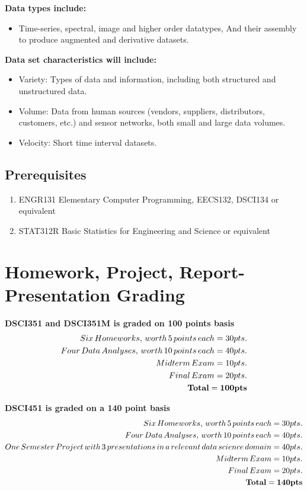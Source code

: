 \documentclass[11pt]{article} %
\begin{document}
    {\bf Data types include:}
    \begin{itemize}
    	\item Time-series, spectral, image and higher order datatypes, 
    	\subitem And their assembly to produce augmented and derivative datasets. 
    \end{itemize}
    
    {\bf Data set characteristics will include:}
    \begin{itemize}
    	\item Variety: Types of data and information, including both structured and unstructured data. 
    	\item Volume: Data from human sources (vendors, suppliers, distributors, customers, etc.) and sensor networks,  both small and large data volumes. 
    	\item Velocity: Short time interval datasets. 
    \end{itemize}

  \subsection{Prerequisites}
  
    \begin{enumerate}
      \item ENGR131 Elementary Computer Programming, EECS132, DSCI134 or equivalent
      \item STAT312R Basic Statistics for Engineering and Science or equivalent
    \end{enumerate}

\section{Homework, Project, Report-Presentation Grading}

  {\bf DSCI351 and DSCI351M is graded on 100 points basis}
  \begin{align*}
    Six \, Homeworks, \, worth \, 5 \, points \, each = 30 pts.\\
    Four \, Data \, Analyses, \, worth \, 10 \, points \, each = 40 pts.\\
    Midterm \, Exam = 10 pts.\\
    Final \, Exam = 20 pts. \\
    {\bf Total = 100 pts}
  \end{align*}
  
  {\bf DSCI451 is graded on a 140 point basis}
  \begin{align*}
    Six \, Homeworks, \, worth \, 5 \, points \, each = 30 pts.\\
    Four \, Data \, Analyses, \, worth \, 10 \, points \, each = 40 pts.\\
    One \,Semester \,Project \,with \,3 \,presentations \,in \,a \,relevant \,data \,science \,domain = 40 pts.\\
    Midterm \, Exam = 10 pts.\\
    Final \, Exam = 20 pts. \\
    {\bf Total = 140 pts}
  \end{align*}
  
\end{document}
